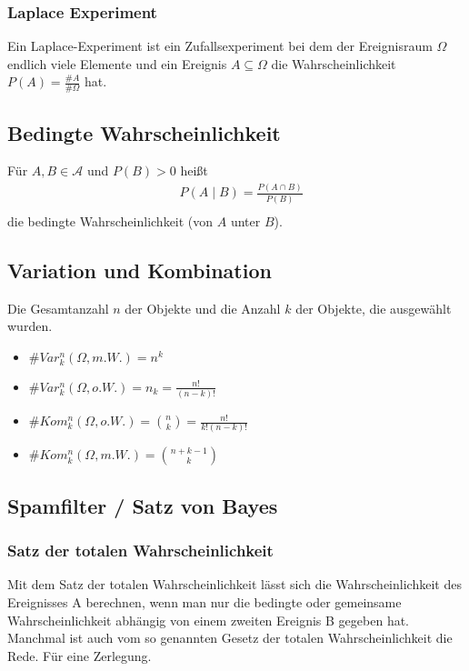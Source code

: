 \documentclass[a4paper]{article}
\begin{document}
\subsubsection{Laplace Experiment}
Ein Laplace-Experiment ist ein Zufallsexperiment bei dem der Ereignisraum $\Omega$ endlich viele Elemente und ein Ereignis $A \subseteq \Omega$ die Wahrscheinlichkeit $P(A) = \frac{\#A}{\#\Omega}$ hat.


\subsection{Bedingte Wahrscheinlichkeit}
Für $A,B \in \mathcal{A}$ und $P(B) > 0$ heißt
\begin{align*}
& P(A \; | \;  B) = \frac{P(A \cap B)}{P(B)} \\
\end{align*}
die bedingte Wahrscheinlichkeit (von $A$ unter $B$).


\subsection{Variation und Kombination}
Die Gesamtanzahl $n$ der Objekte und die Anzahl $k$ der Objekte, die ausgewählt wurden.
\begin{itemize}
\item $\# Var_k^n(\Omega, m.W.)  = n^k$
\item $\# Var_k^n(\Omega, o.W.)  = n_k = \frac{n!}{(n-k)!}$  
\item $\#Kom_k^n(\Omega, o.W.) = \binom{n}{k} = \frac{n!}{k! (n-k)!}$  
\item $\#Kom_k^n(\Omega, m.W.)  = \binom{n + k -1}{k}$  
\end{itemize}


\subsection{Spamfilter / Satz von Bayes}

\subsubsection{Satz der totalen Wahrscheinlichkeit}
Mit dem Satz der totalen Wahrscheinlichkeit lässt sich die Wahrscheinlichkeit des Ereignisses A berechnen, wenn man nur die bedingte oder gemeinsame Wahrscheinlichkeit abhängig von einem zweiten Ereignis B gegeben hat. Manchmal ist auch vom so genannten Gesetz der totalen Wahrscheinlichkeit die Rede.
Für eine Zerlegung.  \\
\end{document}
